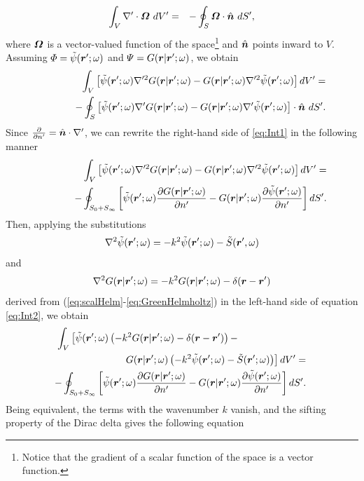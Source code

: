 \begin{eqnarray}
\int_V {\nabla}' \cdot \mbfit{\Omega} \ dV'  &= & - \oint_S \mbfit{\Omega} \cdot \hat{\mbfit{n}} \ dS', \label{eq:divTh}
\end{eqnarray}
where $\mbfit{\Omega}$ is a vector-valued function of the space\footnote{Notice that the gradient of a scalar function of the space is a vector function.} and $\hat{\mbfit{n}}$ points inward to $V$. Assuming $\Phi = \tilde{\psi}(\mbfit{r'}; \omega)$ and $\Psi = G(\mbfit{r}|\mbfit{r'}; \omega)$, we obtain
\begin{eqnarray}
\label{eq:Int1}
& &\int_V \left [ \tilde{\psi}(\mbfit{r'}; \omega) {\nabla}'^2 G(\mbfit{r}|\mbfit{r'}; \omega) - G(\mbfit{r}|\mbfit{r'}; \omega) {\nabla}'^2  \tilde{\psi}(\mbfit{r'}; \omega) \right ] dV'  =  \nonumber \\
& &\hspace{1cm} - \oint_S \left [  \tilde{\psi}(\mbfit{r'}; \omega) {\nabla}' G(\mbfit{r}|\mbfit{r'}; \omega) - G(\mbfit{r}|\mbfit{r'}; \omega) {\nabla}' \tilde{\psi}(\mbfit{r'}; \omega) \right ] \cdot \hat{\mbfit{n}} \ dS'.
\end{eqnarray} Since $\frac{\partial{}}{\partial{n'}} = \hat{\mbfit{n}} \cdot {\nabla}'$, we can rewrite the right-hand side of \eqref{eq:Int1} in the following manner
\begin{eqnarray}
\label{eq:Int2}
& &\int_V \left [ \tilde{\psi}(\mbfit{r'}; \omega) {\nabla}'^2 G(\mbfit{r}|\mbfit{r'}; \omega) - G(\mbfit{r}|\mbfit{r'}; \omega) {\nabla}'^2  \tilde{\psi}(\mbfit{r'}; \omega) \right ] dV' =  \nonumber \\
& & \hspace{1cm} - \oint_{S_0+S_{\infty}} \left [ \tilde{\psi}(\mbfit{r'}; \omega) \frac{ \partial G(\mbfit{r}|\mbfit{r'}; \omega) }{\partial{n'}} - G(\mbfit{r}|\mbfit{r'}; \omega) \frac{\partial{\tilde{\psi}(\mbfit{r'}; \omega)}}{\partial{n'}} \right ]  dS'.
\end{eqnarray} Then, applying the substitutions $$\nabla^2 \tilde{\psi}(\mbfit{r'}; \omega) = - k^2 \tilde{\psi}(\mbfit{r'}; \omega) - \tilde{S}(\mbfit{r'}, \omega)$$ and $$\nabla^2 G(\mbfit{r}|\mbfit{r'}; \omega) = - k^2 G(\mbfit{r}|\mbfit{r'}; \omega) - \delta (\mbfit{r} - \mbfit{r'})$$ derived from (\ref{eq:scalHelm}-\ref{eq:GreenHelmholtz}) in the left-hand side of equation \eqref{eq:Int2}, we obtain
\begin{eqnarray}
\int_V \left [ \tilde{\psi}(\mbfit{r'}; \omega) \left ( - k^2 G(\mbfit{r}|\mbfit{r'}; \omega) - \delta (\mbfit{r} - \mbfit{r'}) \right ) - \right. \nonumber \\
& & \hspace{-7.5cm} \left. G(\mbfit{r}|\mbfit{r'}; \omega) \left (- k^2 \tilde{\psi}(\mbfit{r'}; \omega) - \tilde{S}(\mbfit{r'}; \omega) \right ) \right ] dV' =  \nonumber \\
& & \hspace{-7cm} - \oint_{S_0+S_{\infty}} \left [ \tilde{\psi}(\mbfit{r'}; \omega) \frac{ \partial G(\mbfit{r}|\mbfit{r'}; \omega) }{\partial{n'}} - G(\mbfit{r}|\mbfit{r'}; \omega) \frac{\partial{\tilde{\psi}(\mbfit{r'}; \omega)}}{\partial{n'}} \right ] dS'.
\end{eqnarray} Being equivalent, the terms with the wavenumber $k$ vanish, and the sifting property of the Dirac delta gives the following equation

